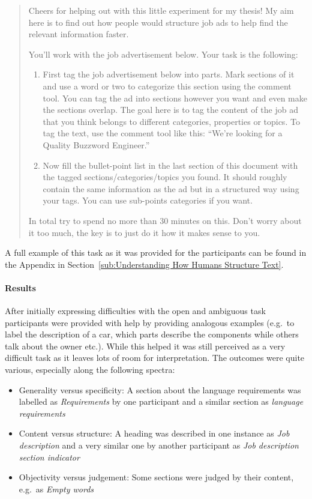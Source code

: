 \blockquote{Cheers for helping out with this little experiment for my thesis! My aim here is to find out how people would structure job ads to help find the relevant information faster.

You'll work with the job advertisement below. Your task is the following:
\begin{enumerate}
  \item First tag the job advertisement below into parts. Mark sections of it and use a word or two to categorize this section using the comment tool. You can tag the ad into sections however you want and even make the sections overlap. The goal here is to tag the content of the job ad that you think belongs to different categories, properties or topics. To tag the text, use the comment tool like this: ``We're looking for a Quality Buzzword Engineer.''
  \item Now fill the bullet-point list in the last section of this document with the tagged sections/categories/topics you found. It should roughly contain the same information as the ad but in a structured way using your tags. You can use sub-points categories if you want.
\end{enumerate}
In total try to spend no more than 30 minutes on this. Don't worry about it too much, the key is to just do it how it makes sense to you.}

A full example of this task as it was provided for the participants can be found in the Appendix in Section~\ref{sub:Understanding How Humans Structure Text}.

\paragraph{Results}
\label{par:Results (Inferring Structure of Job Advertisements)}

After initially expressing difficulties with the open and ambiguous task participants were provided with help by providing analogous examples (e.g.\ to label the description of a car, which parts describe the components while others talk about the owner etc.). While this helped it was still perceived as a very difficult task as it leaves lots of room for interpretation.
The outcomes were quite various, especially along the following spectra:

\begin{itemize}
  \item Generality versus specificity: A section about the language requirements was labelled as \emph{Requirements} by one participant and a similar section as \emph{language requirements}
  \item Content versus structure: A heading was described in one instance as \emph{Job description} and a very similar one by another participant as \emph{Job description section indicator}
  \item Objectivity versus judgement: Some sections were judged by their content, e.g.\ as \emph{Empty words}
\end{itemize}


